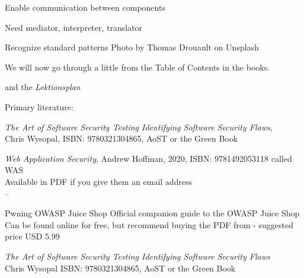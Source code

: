 \documentclass[Screen16to9,17pt]{foils}
\begin{document}



\begin{list2}
\item Enable communication between components
\item Need mediator, interpreter, translator
\item Recognize standard patterns \hfill Photo by Thomas Drouault on Unsplash
\end{list2}



We will now go through a little from the Table of Contents in the books.

and the \emph{Lektionsplan}\\



Primary literature:
\begin{list2}
\item \emph{The Art of Software Security Testing Identifying Software Security Flaws},\\
Chris Wysopal, ISBN: 9780321304865, AoST or the Green Book
\item \emph{Web Application Security}, Andrew Hoffman, 2020, ISBN: 9781492053118 called WAS\\
Available in PDF if you give them an email address \\
-- 
\item Pwning OWASP Juice Shop Official companion guide to the OWASP Juice Shop
Can be found online for free, but recommend buying the PDF from  - suggested price USD 5.99


\end{list2}




\emph{The Art of Software Security Testing Identifying Software Security Flaws}\\
Chris Wysopal ISBN: 9780321304865, AoST or the Green Book

\end{document}
